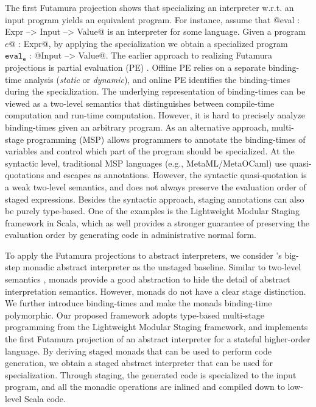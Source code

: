 The first Futamura projection shows that specializing an interpreter w.r.t. an
input program yields an equivalent program. For instance, assume that 
@eval : Expr --> Input --> Value@ is an interpreter for some language.
Given a program $e$@ : Expr@, by applying the specialization we
obtain a specialized program $\texttt{eval}_{\texttt{e}}$ : @Input --> Value@.
The earlier approach to realizing Futamura projections is partial
evaluation (PE) \cite{DBLP:books/daglib/0072559}.
Offline PE relies on a separate binding-time analysis (\textit{static} or
\textit{dynamic}), and online PE identifies the binding-times during the
specialization.
The underlying representation of binding-times can be viewed as a
two-level semantics \cite{NIELSON1989117, NIELSON198859,
Nielson:1992:TFL:130665} that distinguishes between compile-time computation
and run-time computation.  However, it is hard to precisely analyze
binding-times given an arbitrary program. As an alternative approach,
multi-stage programming (MSP) \cite{taha1999multi, DBLP:conf/pepm/TahaS97}
allows programmers to annotate the binding-times of variables and control which
part of the program should be specialized.
At the syntactic level, traditional MSP languages (e.g., MetaML/MetaOCaml) use
quasi-quotations and escapes as annotations. However, the syntactic
quasi-quotation is a weak two-level semantics, and does not always preserve the
evaluation order of staged expressions.
Besides the syntactic approach, staging annotations can also be purely
type-based.  One of the examples is the Lightweight Modular Staging framework
\cite{DBLP:conf/gpce/RompfO10} in Scala, which as well provides a stronger
guarantee of preserving the evaluation order by generating code in
administrative normal form.

To apply the Futamura projections to abstract interpreters, we consider
\citet{DBLP:journals/pacmpl/DaraisLNH17}'s big-step monadic abstract interpreter
as the unstaged baseline.  Similar to two-level semantics \cite{NIELSON1989117},
monads provide a good abstraction to hide the detail of abstract interpretation
semantics. However, monads do not have a clear stage distinction. We further
introduce binding-times and make the monads binding-time polymorphic. Our
proposed framework adopts type-based multi-stage programming from the
Lightweight Modular Staging framework, and implements the first Futamura projection of
an abstract interpreter for a stateful higher-order language. By deriving staged
monads that can be used to perform code generation, we obtain a staged abstract
interpreter that can be used for specialization. Through staging, the generated
code is specialized to the input program, and all the monadic operations are
inlined and compiled down to low-level Scala code.

